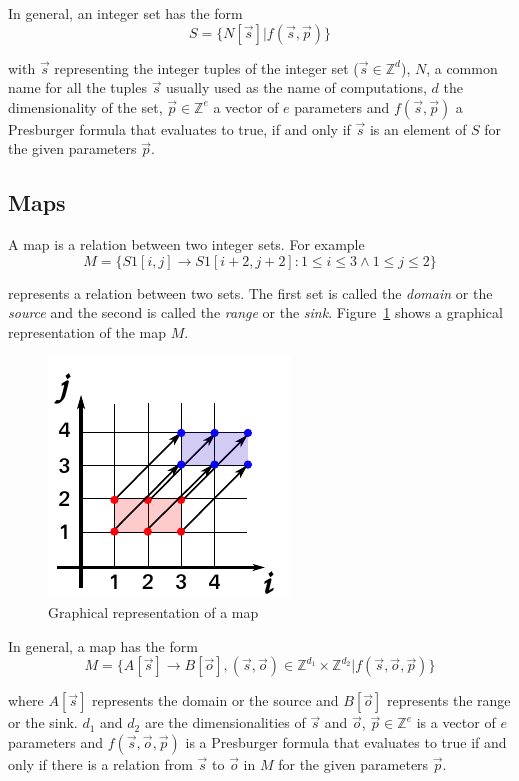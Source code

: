In general, an integer set has the form
$$S = \{N[\vec{s}] | f(\vec{s}, \vec{p})\}$$

\noindent with $\vec{s}$ representing the integer tuples of
the integer set ($\vec{s} \in \mathbb{Z}^d$), $N$, a common name
for all the tuples $\vec{s}$ usually used as the name of computations, $d$ the dimensionality of the set, $\vec{p} \in \mathbb{Z}^e$ a vector of $e$ parameters and $f(\vec{s}, \vec{p})$ a Presburger formula that evaluates to true, if and only if $\vec{s}$ is an element of $S$ for the given parameters $\vec{p}$.

\subsection{Maps}

A map is a relation between two integer sets.  For example
$$M = \{S1[i,j] \rightarrow S1[i+2,j+2] : 1 \leq i \leq 3 \wedge 1 \leq j \leq 2\}$$

\noindent represents a relation between two sets. The first set
is called the \emph{domain} or the \emph{source}
and the second is called the \emph{range} or the
\emph{sink}.
Figure~\ref{fig:map} shows a graphical representation of
the map $M$.

\begin{figure}[th]
  \centering
  \includegraphics[scale=0.7]{figures/map.pdf}
  \caption{Graphical representation of a map}
  \label{fig:map}
\end{figure}

In general, a map has the form
$$M = \{A[\vec{s}] \rightarrow B[\vec{o}], (\vec{s}, \vec{o}) \in \mathbb{Z}^{d_1}\times\mathbb{Z}^{d_2} | f(\vec{s}, \vec{o}, \vec{p})\}$$

\noindent where $A[\vec{s}]$ represents the domain or the
source and $B[\vec{o}]$ represents the range or the sink.
$d_1$ and $d_2$ are the dimensionalities of $\vec{s}$
and $\vec{o}$, $\vec{p} \in \mathbb{Z}^e$ is a vector of $e$ parameters and $f(\vec{s}, \vec{o}, \vec{p})$ is a Presburger formula that evaluates to true if and only if there is a relation from $\vec{s}$ to $\vec{o}$ in $M$ for the given parameters
$\vec{p}$.
